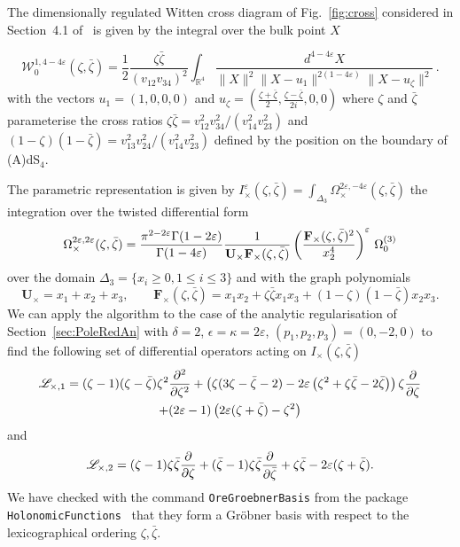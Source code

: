 \documentclass[a4paper,12pt]{article}
\numberwithin{equation}{section}
\numberwithin{figure}{section}
\begin{document}
The dimensionally regulated Witten cross diagram of Fig.~\ref{fig:cross} considered in
Section~4.1 of~\cite{Heckelbacher:2022fbx} is given by the integral
over the bulk point $X$

\begin{equation}
       \mathcal{ W}_0^{1,4-4\varepsilon}(\zeta,\bar\zeta)=\frac12\frac{\zeta\bar\zeta}{(v_{12}v_{34})^2}\int_{\mathbb{R}^4}\frac{d^{4-4\varepsilon}X}{\|X\|^2\|X-u_1\|^{2(1-4\varepsilon)}\|X-u_{\zeta}\|^2}\,.
\end{equation}
with the vectors  $u_1=(1,0,0,0)$ and 
$u_{\zeta}=\left(\frac{\zeta+\bar\zeta}{2},\frac{\zeta-\bar\zeta}{2i},0,0\right)$ where $\zeta$  and $\bar\zeta$ parameterise the cross ratios $\zeta\bar\zeta=v_{12}^2v_{34}^2/(v_{14}^2v_{23}^2)$ and
  $(1-\zeta)(1-\bar\zeta)=v_{13}^2v_{24}^2 /(v_{14}^2 v_{23}^2)$
  defined by the position on the boundary of (A)dS$_4$.

The parametric representation is given by
$
  I^\varepsilon_\times(\zeta,\bar\zeta)= \int_{\Delta_3}   \Omega_\times^{2\varepsilon,-4\varepsilon}(\zeta,\bar\zeta)
$ the integration over the twisted differential form
\begin{equation}
  \Omega_\times^{2\varepsilon,2\varepsilon}(\zeta,\bar\zeta)={\pi^{2-2\varepsilon}\Gamma(1-2\varepsilon)\over\Gamma(1-4\varepsilon)} {1\over \textbf{U}_\times
    \textbf{F}_\times (\zeta,\bar\zeta)} \left(
    \textbf{F}_\times (\zeta,\bar\zeta)^{2}\over  x_2^{4}\right)^\varepsilon  \, \Omega_0^{(3)}
\end{equation}
over the domain $\Delta_3=\{x_i\geq0, 1\leq i\leq 3\}$ and with the graph polynomials
\begin{equation}
  \textbf{U}_\times= x_1+x_2+x_3,  \qquad \textbf{F}_\times (\zeta,\bar\zeta)= x_1x_2+
  \zeta\bar\zeta x_1x_3+ (1-\zeta)(1-\bar\zeta)x_2x_3  .
\end{equation}
We can apply the algorithm to the case of the analytic regularisation
of Section~\ref{sec:PoleRedAn} 
with $\delta=2$, $\epsilon=\kappa=2\varepsilon$, $(p_1,p_2,p_3)=(0,-2,0)$
to find the following set of  differential operators
acting on $I_\times(\zeta,\bar\zeta)$
\begin{multline}
  \mathscr{L}_{\times,1}= (\zeta -1) (\zeta -\bar\zeta) \zeta ^2{\partial^2\over\partial\zeta^2}  +
   \left(\zeta (3 \zeta -\bar\zeta-2)-2\varepsilon  \left(\zeta ^2+\zeta 
   \bar\zeta-2 \bar\zeta\right) \right) \zeta {\partial\over\partial\zeta}\cr+(2 \varepsilon -1) \left(2 \varepsilon  (\zeta +\bar\zeta)-\zeta ^2\right)
\end{multline}
and
\begin{equation}
  \mathscr{L}_{\times,2}= (\zeta -1)\zeta\bar\zeta{\partial\over\partial\zeta}  +
   (\bar\zeta -1)\zeta\bar\zeta{\partial\over\partial\bar\zeta}+\zeta\bar\zeta-2\varepsilon(\zeta+\bar\zeta).
 \end{equation}
 We have checked  with
  the command {\tt OreGroebnerBasis} from the package {\tt
    HolonomicFunctions}~\cite{Koutchan} that
they form a Gr\"obner basis with respect to the lexicographical
ordering $\zeta,\bar\zeta$.
\end{document}
